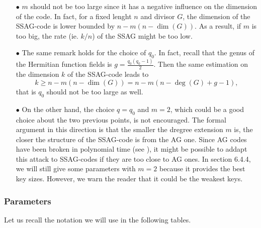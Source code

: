 \documentclass[10pt]{article}
\theoremstyle{definition}
\theoremstyle{definition}
\theoremstyle{definition}
\newcommand{\s}{\vspace{0.3cm}}
\begin{document}
\begin{enumerate}
\item[$\bullet$] $m$ should not be too large since it has a negative influence on the dimension of the code. In fact, for a fixed lenght $n$ and divisor $G$, the dimension of the SSAG-code is lower bounded by $n-m(n-\dim(G))$. As a result, if $m$ is too big, the rate (ie. $k/n$) of the SSAG might be too low.
\item[$\bullet$] The same remark holds for the choice of $q_0$. In fact, recall that the genus of the Hermitian function fields is $g=\frac{q_0(q_0-1)}{2}$. Then the same estimation on the dimension $k$ of the SSAG-code leads to 
\[k \geq n-m(n-\dim(G)) = n-m(n- \deg(G) +g-1),\]
that is $q_0$ should not be too large as well.
\item[$\bullet$] On the other hand, the choice $q=q_0$ and $m=2$, which could be a good choice about the two previous points, is not encouraged. The formal argument in this direction is that the smaller the dregree extension $m$ is, the closer the structure of the SSAG-code is from the AG one. Since AG codes have been broken in polynomial time (see \cite{Cou}), it might be possible to addapt this attack to SSAG-codes if they are too close to AG ones. In section 6.4.4, we will still give some parameters with $m=2$ because it provides the best key sizes. However, we warn the reader that it could be the weakest keys. 
\end{enumerate}

\s 

 \subsubsection{Parameters} 

\s

Let us recall the notation we will use in the following tables.
\end{document}
